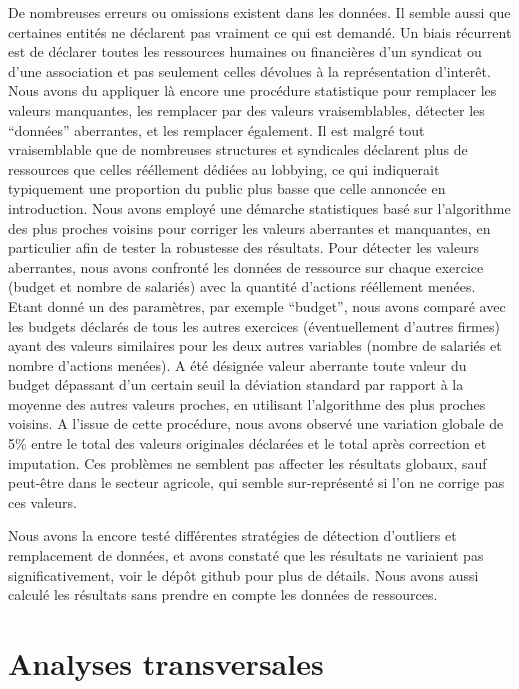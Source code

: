 \documentclass[a4paper,12pt]{article}
\begin{document}
De nombreuses erreurs ou omissions existent dans les données. Il semble aussi que certaines entités ne déclarent pas vraiment ce qui est demandé. Un biais récurrent est de déclarer toutes les ressources humaines ou financières d'un syndicat ou d'une association et pas seulement celles dévolues à la représentation d'inter\^et.
Nous avons du appliquer là encore une procédure statistique pour remplacer les valeurs manquantes, les remplacer par des valeurs vraisemblables, détecter les “données” aberrantes, et les remplacer également.  Il est malgré tout vraisemblable que de nombreuses structures et syndicales déclarent plus de ressources que celles rééllement dédiées au lobbying, ce qui indiquerait typiquement une proportion du public plus basse que celle annoncée en introduction.
Nous avons employé une démarche statistiques basé sur l'algorithme des plus proches voisins pour corriger les valeurs aberrantes et manquantes, en particulier afin de tester la robustesse des résultats. Pour détecter les valeurs aberrantes, nous avons confronté les données de ressource sur chaque exercice (budget et nombre de salariés) avec la quantité d'actions rééllement menées. Etant donné un des paramètres, par exemple ``budget'', nous avons comparé avec les budgets déclarés de tous les autres exercices (éventuellement d'autres firmes) ayant des valeurs similaires pour les deux autres variables (nombre de salariés et nombre d'actions menées). A été désignée valeur aberrante toute valeur du budget dépassant d'un certain seuil la déviation standard par rapport à la moyenne des autres valeurs proches, en utilisant l'algorithme des plus proches voisins.
 A l'issue de cette procédure, nous avons observé une variation globale de 5\% entre le total des valeurs originales déclarées et le total après correction et imputation. Ces problèmes ne semblent pas affecter les résultats globaux, sauf peut-\^etre dans le secteur agricole, qui semble sur-représenté si l'on ne corrige pas ces valeurs.



Nous avons la encore testé différentes stratégies de détection d’outliers et remplacement de données, et avons constaté que les résultats ne variaient pas significativement, voir le dép\^ot github pour plus de détails. Nous avons aussi calculé les résultats sans prendre en compte les données de ressources. 
 


\section{Analyses transversales}
\end{document}
